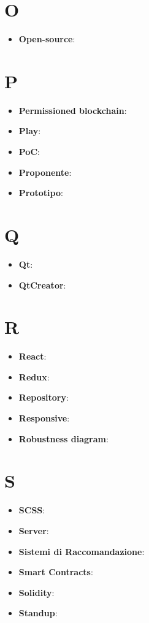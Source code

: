\documentclass[a4paper, oneside, openany]{article}
\begin{document}
\section{O}
\begin{itemize}
\item \textbf{Open-source}:
\end{itemize}

\section{P}
\begin{itemize}
\item \textbf{Permissioned blockchain}:
\item \textbf{Play}:
\item \textbf{PoC}:
\item \textbf{Proponente}:
\item \textbf{Prototipo}:
\end{itemize}

\section{Q}
\begin{itemize}
\item \textbf{Qt}:
\item \textbf{QtCreator}:
\end{itemize}

\section{R}
\begin{itemize}
\item \textbf{React}:
\item \textbf{Redux}:
\item \textbf{Repository}:
\item \textbf{Responsive}:
\item \textbf{Robustness diagram}:
\end{itemize}

\section{S}
\begin{itemize}
\item \textbf{SCSS}:
\item \textbf{Server}:
\item \textbf{Sistemi di Raccomandazione}:
\item \textbf{Smart Contracts}:
\item \textbf{Solidity}:
\item \textbf{Standup}:
\end{itemize}
\end{document}
